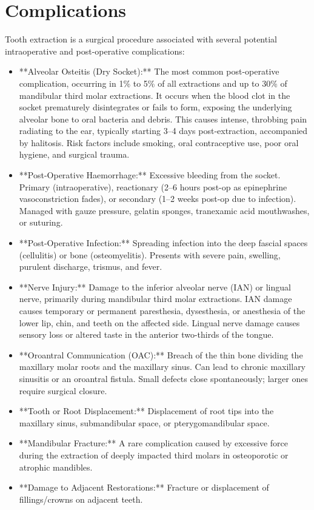 \section*{Complications}
Tooth extraction is a surgical procedure associated with several potential intraoperative and post-operative complications:

\begin{itemize}
  \item **Alveolar Osteitis (Dry Socket):** The most common post-operative complication, occurring in 1\% to 5\% of all extractions and up to 30\% of mandibular third molar extractions. It occurs when the blood clot in the socket prematurely disintegrates or fails to form, exposing the underlying alveolar bone to oral bacteria and debris. This causes intense, throbbing pain radiating to the ear, typically starting 3--4 days post-extraction, accompanied by halitosis. Risk factors include smoking, oral contraceptive use, poor oral hygiene, and surgical trauma.
  \item **Post-Operative Haemorrhage:** Excessive bleeding from the socket. Primary (intraoperative), reactionary (2--6 hours post-op as epinephrine vasoconstriction fades), or secondary (1--2 weeks post-op due to infection). Managed with gauze pressure, gelatin sponges, tranexamic acid mouthwashes, or suturing.
  \item **Post-Operative Infection:** Spreading infection into the deep fascial spaces (cellulitis) or bone (osteomyelitis). Presents with severe pain, swelling, purulent discharge, trismus, and fever.
  \item **Nerve Injury:** Damage to the inferior alveolar nerve (IAN) or lingual nerve, primarily during mandibular third molar extractions. IAN damage causes temporary or permanent paresthesia, dysesthesia, or anesthesia of the lower lip, chin, and teeth on the affected side. Lingual nerve damage causes sensory loss or altered taste in the anterior two-thirds of the tongue.
  \item **Oroantral Communication (OAC):** Breach of the thin bone dividing the maxillary molar roots and the maxillary sinus. Can lead to chronic maxillary sinusitis or an oroantral fistula. Small defects close spontaneously; larger ones require surgical closure.
  \item **Tooth or Root Displacement:** Displacement of root tips into the maxillary sinus, submandibular space, or pterygomandibular space.
  \item **Mandibular Fracture:** A rare complication caused by excessive force during the extraction of deeply impacted third molars in osteoporotic or atrophic mandibles.
  \item **Damage to Adjacent Restorations:** Fracture or displacement of fillings/crowns on adjacent teeth.
\end{itemize}

